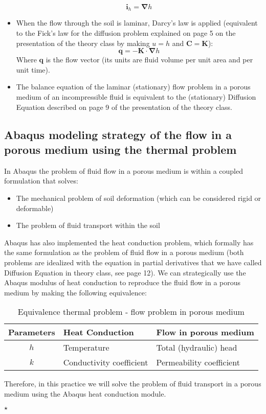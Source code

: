 \begin{itemize}
\begin{equation}
    \label{eq:0103}
    \textbf{i}_h=\bm{\nabla}h
  \end{equation}
\item When the flow through the soil is laminar, Darcy's law is
  applied (equivalent to the Fick's law for the diffusion problem
  explained on page 5 on the presentation of the theory class by
  making $u=h$ and $\bm{C}=\bm{K}$):
  \begin{equation}
    \label{eq:0104}
    \bm{q}=-\bm{K}\cdot \bm{\nabla}h
  \end{equation}
  Where $\bm{q}$ is the flow vector (its units are fluid volume per
  unit area and per unit time).
\item The balance equation of the laminar (stationary) flow problem in
  a porous medium of an incompressible fluid is equivalent to the
  (stationary) Diffusion Equation described on page 9 of the
  presentation of the theory class.
\end{itemize}

\subsection{Abaqus modeling strategy of the flow in a porous medium
  using the thermal problem}

In Abaqus the problem of fluid flow in a porous medium is within a
coupled formulation that solves:
\begin{itemize}
\item The mechanical problem of soil deformation (which can be
  considered rigid or deformable)
\item The problem of fluid transport within the soil
\end{itemize}

Abaqus has also implemented the heat conduction problem, which
formally has the same formulation as the problem of fluid flow in a
porous medium (both problems are idealized with the equation in
partial derivatives that we have called Diffusion Equation in theory
class, see page 12). We can strategically use the Abaqus modulus of heat conduction
to reproduce the fluid flow in a porous medium by making the following
equivalence:
\begin{table}[!h]
  \centering
  \begin{tabular}{cll}
    \hline
    Parameters&Heat Conduction & Flow in porous medium\\
    \hline
    $h$&Temperature  &Total (hydraulic) head    \\
    $k$&Conductivity coefficient& Permeability coefficient  \\
    \hline
  \end{tabular}
  \caption{Equivalence thermal problem - flow problem in porous medium}
  \label{tab:101}
\end{table}

Therefore, in this practice we will solve the problem of fluid
transport in a porous medium using the Abaqus heat conduction module.



\hspace{20mm}\hrulefill$\star$\hrulefill\hspace{20mm}
